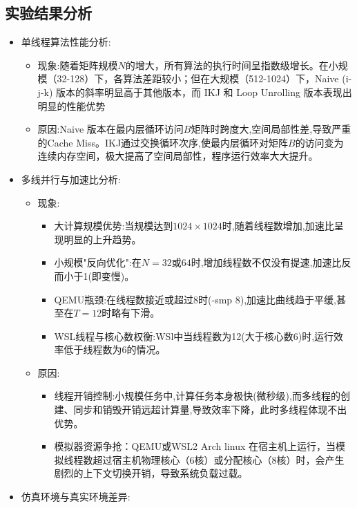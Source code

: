 \subsection{实验结果分析}
\begin{itemize}
    \item 单线程算法性能分析:
    \begin{itemize}
        \item 现象:随着矩阵规模$N$的增大，所有算法的执行时间呈指数级增长。在小规模（32-128）下，各算法差距较小；但在大规模（512-1024）下，Naive (i-j-k) 版本的斜率明显高于其他版本，而 IKJ 和 Loop Unrolling 版本表现出明显的性能优势
        \item 原因:Naive 版本在最内层循环访问$B$矩阵时跨度大,空间局部性差,导致严重的Cache Miss。IKJ通过交换循环次序,使最内层循环对矩阵$B$的访问变为连续内存空间，极大提高了空间局部性，程序运行效率大大提升。
    \end{itemize}
    \item 多线并行与加速比分析:
    \begin{itemize}
        \item 现象:
        \begin{itemize}
            \item 大计算规模优势:当规模达到$1024 \times 1024$时,随着线程数增加,加速比呈现明显的上升趋势。
            \item 小规模"反向优化":在$N = 32$或$64$时,增加线程数不仅没有提速,加速比反而小于1(即变慢)。
            \item QEMU瓶颈:在线程数接近或超过8时(-smp 8),加速比曲线趋于平缓,甚至在$T = 12$时略有下滑。
            \item WSL线程与核心数权衡:WSl中当线程数为12(大于核心数6)时,运行效率低于线程数为6的情况。
        \end{itemize}
        \item 原因:
        \begin{itemize}
            \item 线程开销控制:小规模任务中,计算任务本身极快(微秒级),而多线程的创建、同步和销毁开销远超计算量,导致效率下降，此时多线程体现不出优势。
            \item 模拟器资源争抢：QEMU或WSL2 Arch linux 在宿主机上运行，当模拟线程数超过宿主机物理核心（6核）或分配核心（8核）时，会产生剧烈的上下文切换开销，导致系统负载过载。
        \end{itemize}
    \end{itemize}
    \item 仿真环境与真实环境差异:
    \begin{itemize}

\end{itemize}
\end{itemize}
